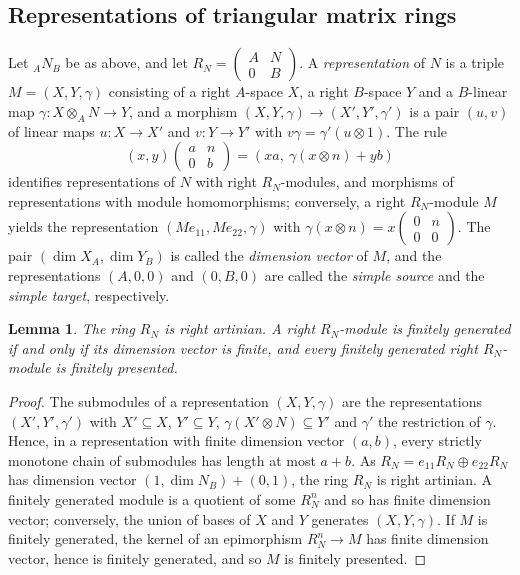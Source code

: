 \documentclass[11pt,a4paper]{amsart}
\newtheorem{lemma}[theorem]{Lemma}
\numberwithin{equation}{section}
\begin{document}
\subsection{Representations of triangular matrix rings}\label{subsec:rep}

Let ${}_AN_B$ be as above, and let $R_N=\left(\begin{smallmatrix}A&N\\0&B\end{smallmatrix}\right)$. A \emph{representation} of $N$ is a triple $M=(X,Y,\gamma)$ consisting of a right $A$-space $X$, a right $B$-space $Y$ and a $B$-linear map $\gamma\colon X\otimes_AN\to Y$, and a morphism $(X,Y,\gamma)\to(X',Y',\gamma')$ is a pair $(u,v)$ of linear maps $u\colon X\to X'$ and $v\colon Y\to Y'$ with $v\gamma=\gamma'(u\otimes1)$. The rule
\[
(x,y)\begin{pmatrix}a&n\\0&b\end{pmatrix}=(xa,\ \gamma(x\otimes n)+yb)
\]
identifies representations of $N$ with right $R_N$-modules, and morphisms of representations with module homomorphisms; conversely, a right $R_N$-module $M$ yields the representation $(Me_{11},Me_{22},\gamma)$ with $\gamma(x\otimes n)=x\left(\begin{smallmatrix}0&n\\0&0\end{smallmatrix}\right)$. The pair $(\dim X_A,\dim Y_B)$ is called the \emph{dimension vector} of $M$, and the representations $(A,0,0)$ and $(0,B,0)$ are called the \emph{simple source} and the \emph{simple target}, respectively.

\begin{lemma}\label{lem:artinian}
The ring $R_N$ is right artinian. A right $R_N$-module is finitely generated if and only if its dimension vector is finite, and every finitely generated right $R_N$-module is finitely presented.
\end{lemma}

\begin{proof}
The submodules of a representation $(X,Y,\gamma)$ are the representations $(X',Y',\gamma')$ with $X'\subseteq X$, $Y'\subseteq Y$, $\gamma(X'\otimes N)\subseteq Y'$ and $\gamma'$ the restriction of $\gamma$. Hence, in a representation with finite dimension vector $(a,b)$, every strictly monotone chain of submodules has length at most $a+b$. As $R_N=e_{11}R_N\oplus e_{22}R_N$ has dimension vector $(1,\dim N_B)+(0,1)$, the ring $R_N$ is right artinian. A finitely generated module is a quotient of some $R_N^n$ and so has finite dimension vector; conversely, the union of bases of $X$ and $Y$ generates $(X,Y,\gamma)$. If $M$ is finitely generated, the kernel of an epimorphism $R_N^n\to M$ has finite dimension vector, hence is finitely generated, and so $M$ is finitely presented.
\end{proof}
\end{document}
